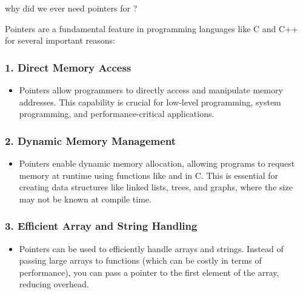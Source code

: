 \begin{userprompt}

why did we ever need pointers for ?

\end{userprompt}

\begin{botresponse}

Pointers are a fundamental feature in programming languages like C and C++ for several important reasons:

\subsubsection{1. \textbf{Direct Memory Access}}

\begin{itemize}
\item Pointers allow programmers to directly access and manipulate memory addresses. This capability is crucial for low-level programming, system programming, and performance-critical applications.
\end{itemize}

\subsubsection{2. \textbf{Dynamic Memory Management}}

\begin{itemize}
\item Pointers enable dynamic memory allocation, allowing programs to request memory at runtime using functions like  and  in C. This is essential for creating data structures like linked lists, trees, and graphs, where the size may not be known at compile time.
\end{itemize}

\subsubsection{3. \textbf{Efficient Array and String Handling}}

\begin{itemize}
\item Pointers can be used to efficiently handle arrays and strings. Instead of passing large arrays to functions (which can be costly in terms of performance), you can pass a pointer to the first element of the array, reducing overhead.
\end{itemize}


\end{botresponse}
